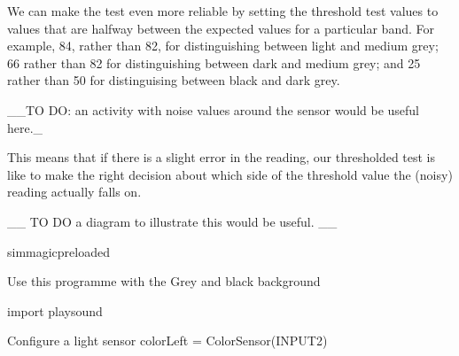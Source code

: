 \documentclass[letterpaper,10pt,english]{sphinxmanual}
\begin{document}
{\begin{sphinxVerbatim}[commandchars=\\\{\}]
   
   
   
\end{sphinxVerbatim}

We can make the test even more reliable by setting the threshold test values to values that are halfway between the expected values for a particular band. For example, 84, rather than 82, for distinguishing between light and medium grey; 66 rather than 82 for distinguishing between dark and medium grey; and 25 rather than 50 for distinguising between black and dark grey.

\_\_TO DO: an activity with noise values around the sensor would be useful here.\_

This means that if there is a slight error in the reading, our thresholded test is like to make the right decision about which side of the threshold value the (noisy) reading actually falls on.

\_\_ TO DO \sphinxhyphen{} a diagram to illustrate this would be useful. \_\_

{
\begin{sphinxVerbatim}[commandchars=\\\{\}]
\llap{\color{nbsphinxin}[ ]:\,\hspace{\fboxrule}\hspace{\fboxsep}}\PYGZpc{}\PYGZpc{}sim\PYGZus{}magic\PYGZus{}preloaded

\PYGZsh{} Use this programme with the \PYGZdq{}Grey and black\PYGZdq{} background

import playsound

\PYGZsh{} Configure a light sensor
colorLeft = ColorSensor(INPUT\PYGZus{}2)


\end{sphinxVerbatim}}}
\end{document}
